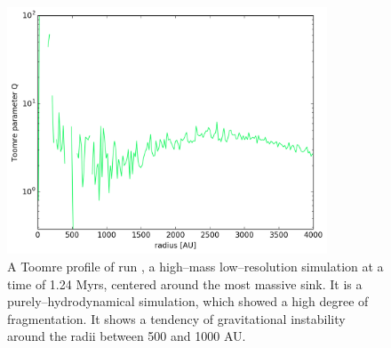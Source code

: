 \begin{figure}[!htb]
 \centering
 \includegraphics[width=0.85\textwidth]{Figures/toomre_hydro}
 \captionsetup{justification=justified,singlelinecheck=false,width=\linewidth}
 \decoRule
 \caption[Toomre profile of a pure--hydrodynamics run]{A Toomre profile of run , a high--mass low--resolution simulation at a time of 1.24 Myrs, centered around the most massive sink.
                                                       It is a purely--hydrodynamical simulation, which showed a high degree of fragmentation.
                                                       It shows a tendency of gravitational instability around the radii between 500 and 1000 AU.}
\label{fig:Toomre_hydro}
\end{figure}
\FloatBarrier

